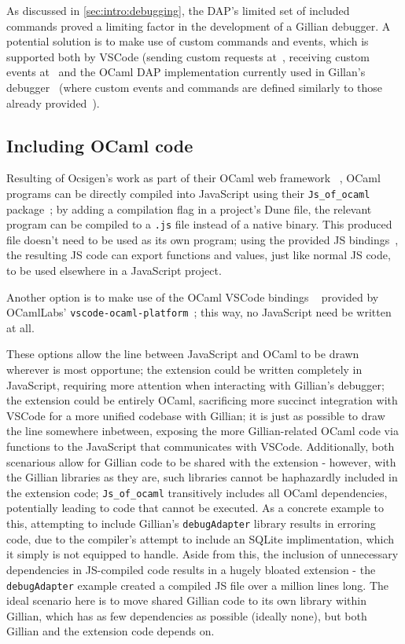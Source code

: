 As discussed in \autoref{sec:intro:debugging}, the DAP's limited set of
included commands proved a limiting factor in the development of a Gillian
debugger. A potential solution is to make use of custom commands and events,
which is supported both by VSCode (sending custom requests
at~\cite{vscode-dap-custom-request}, receiving custom events
at~\cite{vscode-dap-custom-event} and the OCaml DAP
implementation currently used in Gillan's debugger~\cite{ocaml-dap} (where
custom events and commands are defined similarly to those already
provided~\cite{ocaml-dap-custom}).


\subsection{Including OCaml code}

Resulting of Ocsigen's work as part of their OCaml web framework
~\cite{ocsigen-framework}, OCaml programs can be directly compiled into
JavaScript using their \texttt{Js\_of\_ocaml} package~\cite{js-of-ocaml}; by
adding a compilation flag in a project's Dune file, the relevant program can be
compiled to a \texttt{.js} file instead of a native binary. This produced file
doesn't need to be used as its own program; using the provided JS
bindings~\cite{js-of-ocaml-bindings}, the resulting JS code can export
functions and values, just like normal JS code, to be used elsewhere in a
JavaScript project.

Another option is to make use of the OCaml VSCode bindings
~\cite{vscode-ocaml-bindings} provided by OCamlLabs'
\texttt{vscode-ocaml-platform}~\cite{vscode-ocaml-platform, ocamllabs}; this
way, no JavaScript need be written at all.

These options allow the line between JavaScript and OCaml to be drawn wherever
is most opportune; the extension could be written completely in JavaScript,
requiring more attention when interacting with Gillian's debugger; the
extension could be entirely OCaml, sacrificing more succinct integration with
VSCode for a more unified codebase with Gillian; it is just as possible to draw
the line somewhere inbetween, exposing the more Gillian-related OCaml code via
functions to the JavaScript that communicates with VSCode. Additionally, both
scenarious allow for Gillian code to be shared with the extension - however,
with the Gillian libraries as they are, such libraries cannot be haphazardly
included in the extension code; \texttt{Js\_of\_ocaml} transitively includes all
OCaml dependencies, potentially leading to code that cannot be executed. As a
concrete example to this, attempting to include Gillian's \texttt{debugAdapter}
library results in erroring code, due to the compiler's attempt to include an
SQLite implimentation, which it simply is not equipped to handle. Aside from
this, the inclusion of unnecessary dependencies in JS-compiled code results in
a hugely bloated extension - the \texttt{debugAdapter} example created a
compiled JS file over a million lines long. The ideal scenario here is to move
shared Gillian code to its own library within Gillian, which has as few
dependencies as possible (ideally none), but both Gillian and the extension
code depends on.

